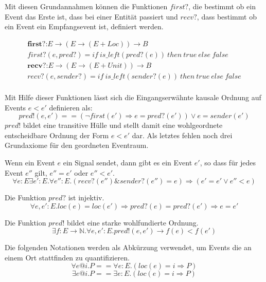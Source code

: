 Mit diesen Grundannahmen können die Funktionen $first?$, die bestimmt ob
ein Event das Erste ist, dass bei einer Entität passiert und $recv?$,
dass bestimmt ob ein Event ein Empfangsevent ist, definiert werden.

\begin{gather*}
  \textbf{first?:}E\rightarrow (E\rightarrow (E+Loc))\rightarrow B\\
  first?(e,pred?) = if\ is\_left(pred?(e))\ then\ true\ else\ false\\
  \textbf{recv?:}E\rightarrow (E\rightarrow (E+Unit))\rightarrow B\\
  recv?(e,sender?) = if\ is\_left(sender?(e))\ then\ true\ else\ false\\
\end{gather*}

Mit Hilfe dieser Funktionen lässt sich die Eingangserwähnte kausale Ordnung auf Events
$e < e'$ definieren als:
\[
  pred!(e,e') == (\neg first(e')\Rightarrow e = pred?(e')) \vee e = sender(e')
\]
$pred!$ bildet eine transitive Hülle und stellt damit eine wohlgeordnete
entscheidbare Ordnung der Form $e < e'$ dar. Als letztes fehlen noch
drei Grundaxiome für den geordneten Eventraum.~\cite{bickford2005causal}

\begin{axiom}
  Wenn ein Event $e$ ein Signal sendet, dann gibt es ein Event $e'$, so dass für
  jedes Event $e''$ gilt, $e'' = e'$ oder $e'' < e'$.\\
  \[
    \forall e:E \exists e':E. \forall e'':E . (recv?(e'') \& sender?(e'')=e)\Rightarrow (e' = e' \vee e'' < e)
  \]
\end{axiom}

\begin{axiom}
  Die Funktion $pred?$ ist injektiv.
  \[
    \forall e,e':E.loc(e) = loc(e')\Rightarrow pred?(e) = pred?(e')\Rightarrow e=e'
  \]
\end{axiom}

\begin{axiom}
  Die Funktion $pred!$ bildet eine starke wohlfundierte Ordnung.
  \[
    \exists f:E\rightarrow \mathbb{N}.\forall e,e':E.pred!(e,e')\rightarrow f(e)<f(e')
  \]
\end{axiom}

\begin{defi}
  Die folgenden Notationen werden als Abkürzung verwendet, um Events die an einem
  Ort stattfinden zu quantifizieren.
  \[
    \forall e@i.P == \forall e:E.(loc(e) = i\Rightarrow P)
  \]
  \[
    \exists e@i.P == \exists e:E.(loc(e) = i\Rightarrow P)
  \]
\end{defi}

